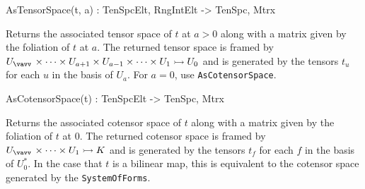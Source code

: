 \begin{intrinsics}
AsTensorSpace(t, a) : TenSpcElt, RngIntElt -> TenSpc, Mtrx
\end{intrinsics}

Returns the associated tensor space of $t$ at $a>0$ along with a matrix given by
the foliation of $t$ at $a$. 
The returned tensor space is framed by 
$U_{\vav}\times \cdots \times U_{a+1}\times U_{a-1}\times \cdots \times U_1\rightarrowtail U_0$
and is generated by the tensors $t_u$ for each $u$ in the basis of $U_a$.
For $a=0$, use \texttt{AsCotensorSpace}.

\begin{intrinsics}
AsCotensorSpace(t) : TenSpcElt -> TenSpc, Mtrx
\end{intrinsics}

Returns the associated cotensor space of $t$ along with a matrix given by
the foliation of $t$ at $0$. 
The returned cotensor space is framed by 
$U_{\vav}\times \cdots \times U_1\rightarrowtail K$
and is generated by the tensors $t_f$ for each $f$ in the basis of $U_0^*$.
In the case that $t$ is a bilinear map, this is equivalent to the cotensor space generated by the \texttt{SystemOfForms}.

